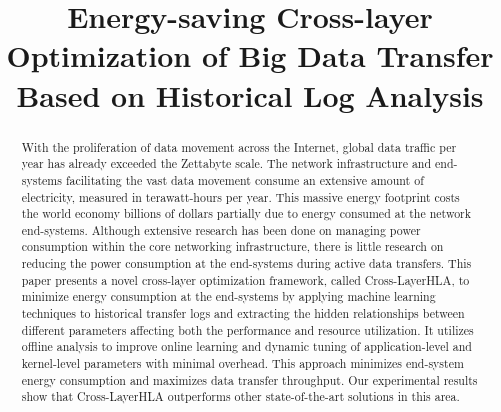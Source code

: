 \documentclass[conference]{IEEEtran}
\begin{document}
\title{Energy-saving Cross-layer Optimization of Big Data Transfer Based on Historical Log Analysis\\
}

\author{  
}

\maketitle
\begin{abstract}
With the proliferation of data movement across the Internet, global data traffic per year has already exceeded the Zettabyte scale. The network infrastructure and end-systems facilitating the vast data movement consume an extensive amount of electricity, measured in terawatt-hours per year. This massive energy footprint costs the world economy billions of dollars partially due to energy consumed at the network end-systems. Although extensive research has been done on managing power consumption within the core networking infrastructure, there is little research on reducing the power consumption at the end-systems during active data transfers. This paper presents a novel cross-layer optimization framework, called Cross-LayerHLA, to minimize energy consumption at the end-systems by applying machine learning techniques to historical transfer logs and extracting the hidden relationships between different parameters affecting both the performance and resource utilization. %
It utilizes offline analysis to improve online learning and dynamic tuning of application-level and kernel-level parameters with minimal overhead. This approach minimizes end-system energy consumption and maximizes data transfer throughput. Our experimental results show that Cross-LayerHLA outperforms other state-of-the-art solutions in this area. 
\end{abstract}
\end{document}
